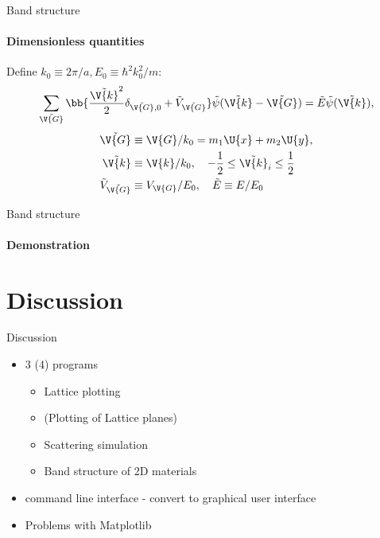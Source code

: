 \documentclass{beamer}
\begin{document}
\begin{frame}{Band structure}
\framesubtitle{Dimensionless quantities}
Define $ k_0 \equiv 2\pi/a, E_0 \equiv \hbar^2 k_0^2/m $:
\begin{equation*}
	\sum_{\tilde{\V{G}}} \bb{\frac{\tilde{\V{k}}^2}{2} \delta_{\tilde{\V{G}},0} + \tilde{V}_{\tilde{\V{G}}}} \tilde{\psi}(\tilde{\V{k}} - \tilde{\V{G}}) = \tilde{E} \tilde{\psi}(\tilde{\V{k}}),
\end{equation*}
\pause
\begin{align*}
	\tilde{\V{G}} &\equiv \V{G}/k_0 = m_1 \U{x}+m_2 \U{y}, \\
	\tilde{\V{k}} &\equiv \V{k}/k_0, \quad -\frac{1}{2} \leq \tilde{\V{k}}_i \leq \frac{1}{2}\\
	\tilde{V}_{\tilde{\V{G}}} &\equiv V_{\V{G}} / E_0, \quad \tilde{E} \equiv E/E_0
\end{align*}
\end{frame}

\begin{frame}{Band structure}
\framesubtitle{Demonstration}
\end{frame}



\section{Discussion}
\begin{frame}{Discussion}
\begin{itemize}
	\item 3 (4) programs
	\begin{itemize}
		\item Lattice plotting
		\item (Plotting of Lattice planes)
		\item Scattering simulation
		\item Band structure of 2D materials
	\end{itemize}
	\item command line interface - convert to graphical user interface
	\item Problems with Matplotlib
\end{itemize}
\end{frame}
\end{document}
